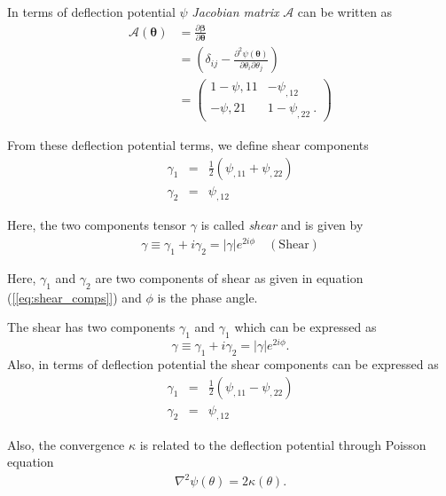   In terms of deflection potential $\psi$  \textit{Jacobian matrix} $\mathscr{A}$
  can be written as
  \begin{align}\label{[eq:jacobian]}
    \mathscr{A}(\boldsymbol{\theta} ) & = \frac{\partial \boldsymbol{\beta} }{ \partial \boldsymbol{\theta} } \\
      & = (\delta_{ij} - \frac{\partial^2 \psi(\boldsymbol{\theta})}{\partial \theta_i \partial \theta_j}) \nonumber \\
      & = {  \begin{pmatrix}
               1 - \psi{,11}  &-\psi_{,12}  \\
               -\psi{,21}  & 1 - \psi_{,22} \ .
            \end{pmatrix}
          }
  \end{align}

  From these deflection potential terms, we define shear components
  \begin{eqnarray}\label{[eq:shear_comps]}
    \gamma_1 &=& \frac{1}{2} (\psi_{,11} + \psi_{,22} ) \\
    \gamma_2 &=& \psi_{,12}
  \end{eqnarray}

  Here, the two components tensor $\gamma$ is called \textit{shear} and is
  given by
  \begin{eqnarray}\label{[eq:shear]}
    \boxed{\gamma \equiv \gamma_1 + i \gamma_2
           = \lvert\gamma\rvert e^{2i \phi}} \quad (\text{Shear})
  \end{eqnarray}

  Here, $\gamma_1$ and $\gamma_2$ are two components of shear as given in equation
  (\ref{[eq:shear_comps]}) and $\phi$ is the phase angle.

  The shear has two components $\gamma_1$ and $\gamma_1$ which can be expressed as
  \begin{equation}\label{[eq:shear]}
    \gamma \equiv \gamma_1 + i \gamma_2 = \lvert\gamma\rvert e^{2i \phi}.
  \end{equation}
  Also, in terms of deflection potential the shear components can be expressed as
  \begin{eqnarray}\label{[eq:shear_comp]}
    \gamma_1 &=& \frac{1}{2} (\psi_{,11} - \psi_{,22} ) \\
    \gamma_2 &=& \psi_{,12} \nonumber
  \end{eqnarray}

  Also, the convergence $\kappa$ is related to the deflection potential through
  Poisson equation
  \begin{eqnarray}\label{[eq:kappa_psi]}
    \nabla^2 \psi(\theta) = 2 \kappa(\theta).
  \end{eqnarray}


